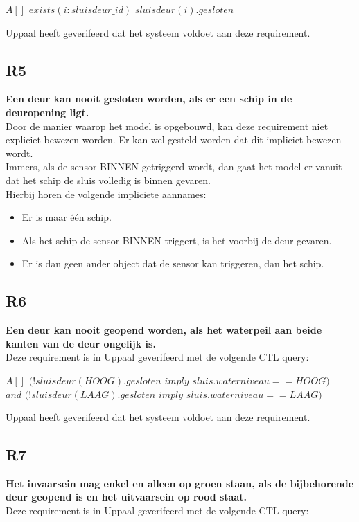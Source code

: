 \documentclass{article} %
\begin{document}
\begin{boxA}
    $A[]$ $exists(i:sluisdeur\_id)$ $sluisdeur(i).gesloten$
\end{boxA}

Uppaal heeft geverifeerd dat het systeem voldoet aan deze requirement.

\subsection{R5}
\textbf{Een deur kan nooit gesloten worden, als er een schip in de deuropening ligt.} \\
Door de manier waarop het model is opgebouwd, kan deze requirement niet expliciet bewezen worden. Er kan wel gesteld worden dat dit impliciet bewezen wordt. \\
Immers, als de sensor BINNEN getriggerd wordt, dan gaat het model er vanuit dat het schip de sluis volledig is binnen gevaren. \\
Hierbij horen de volgende impliciete aannames:
\begin{itemize}
    \item Er is maar één schip.
    \item Als het schip de sensor BINNEN triggert, is het voorbij de deur gevaren.
    \item Er is dan geen ander object dat de sensor kan triggeren, dan het schip.
\end{itemize}
\newpage

\subsection{R6}
\textbf{Een deur kan nooit geopend worden, als het waterpeil aan beide kanten van de deur ongelijk is. } \\
Deze requirement is in Uppaal geverifeerd met de volgende CTL query:

\begin{boxA}
    $A[]$ $(!sluisdeur(HOOG).gesloten$ $imply$ $sluis.waterniveau==HOOG)$ \\ $ and$ $(!sluisdeur(LAAG).gesloten $ $imply$ $sluis.waterniveau==LAAG)$
\end{boxA}

Uppaal heeft geverifeerd dat het systeem voldoet aan deze requirement.

\subsection{R7}
\textbf{Het invaarsein mag enkel en alleen op groen staan, als de bijbehorende deur geopend is en het uitvaarsein op rood staat.} \\
Deze requirement is in Uppaal geverifeerd met de volgende CTL query:
\end{document}
